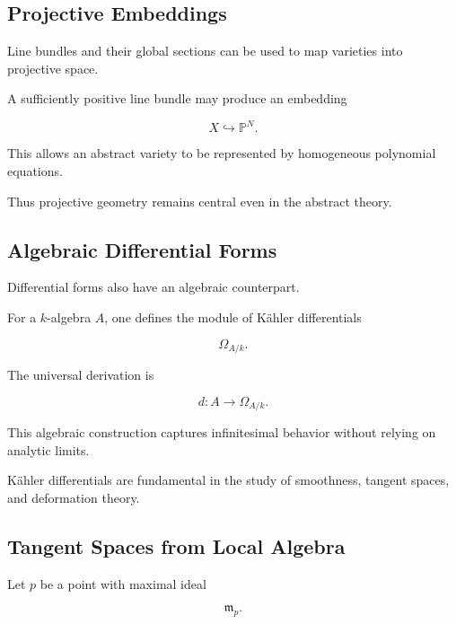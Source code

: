 \subsection{Projective Embeddings}
\label{subsec:projective-embeddings}

Line bundles and their global sections can be used to map varieties into
projective space.

A sufficiently positive line bundle may produce an embedding

\[
\boxed{
X\hookrightarrow\mathbb{P}^N.
}
\]

This allows an abstract variety to be represented by homogeneous polynomial
equations.

Thus projective geometry remains central even in the abstract theory.

\subsection{Algebraic Differential Forms}
\label{subsec:algebraic-differential-forms}

Differential forms also have an algebraic counterpart.

For a \(k\)-algebra \(A\), one defines the module of K\"ahler differentials

\[
\boxed{
\Omega_{A/k}.
}
\]

The universal derivation is

\[
\boxed{
d:A\to\Omega_{A/k}.
}
\]

This algebraic construction captures infinitesimal behavior without relying
on analytic limits.

K\"ahler differentials are fundamental in the study of smoothness, tangent
spaces, and deformation theory.

\subsection{Tangent Spaces from Local Algebra}
\label{subsec:tangent-space-local-algebra}

Let \(p\) be a point with maximal ideal

\[
\mathfrak m_p.
\]

